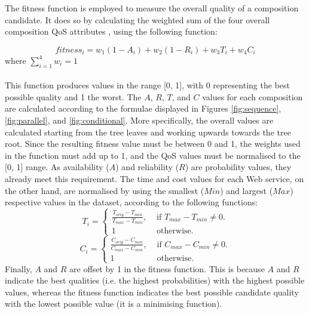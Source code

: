 \documentclass[conference]{IEEEtran}
\begin{document}
The fitness function is employed to measure the overall quality of a composition candidate. It does so by calculating the weighted sum of the four overall composition QoS attributes \cite{silva2014graph}, using the following function:

\vspace{-0.6cm}
\begin{equation}
fitness_i = w_1(1 - A_i) + w_2(1 - R_i) + w_3T_i + w_4C_i
\end{equation}
\vspace{-0.3cm}
\noindent where $\sum_{i=1}^{4} w_i = 1$
\vspace{-0.3cm}
\\\\

This function produces values in the range [0, 1], with 0 representing the best possible quality and 1 the worst. The $A$, $R$, $T$, and $C$ values for each composition are calculated according to the formulae displayed in Figures \ref{fig:sequence}, \ref{fig:parallel}, and \ref{fig:conditional}. More specifically, the overall values are calculated starting from the tree leaves and working upwards towards the tree root. Since the resulting fitness value must be between 0 and 1, the weights used in the function must add up to 1, and the QoS values must be normalised to the [0, 1] range. As availability ($A$) and reliability ($R$) are probability values, they already meet this requirement. The time and cost values for each Web service, on the other hand, are normalised by using the smallest ($Min$) and largest ($Max$) respective values in the dataset, according to the following functions:
\vspace{-0.05cm}
\begin{equation}
T_i = \begin{cases}
     \frac{T_{orig} - T_{min}}{T_{max} - T_{min}}, & \text{ if $T_{max} - T_{min} \neq 0$}.\\
     1 & \text{ otherwise}.
    \end{cases}
\end{equation}
\begin{equation}
C_i = \begin{cases}
     \frac{C_{orig} - C_{min}}{C_{max} - C_{min}}, & \text{ if $C_{max} - C_{min} \neq 0$}.\\
     1 & \text{ otherwise}.
    \end{cases}
\end{equation}
\vspace{-0.05cm}
Finally, $A$ and $R$ are offset by 1 in the fitness function. This is because $A$ and $R$ indicate the best qualities (i.e. the highest probabilities) with the highest possible values, whereas the fitness function indicates the best possible candidate quality with the lowest possible value (it is a minimising function).
\end{document}
